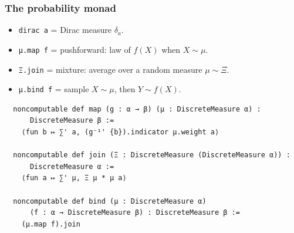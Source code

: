 \documentclass[11pt,aspectratio=169]{beamer}
\newcommand{\leanline}[1]{\texttt{#1}}%
\begin{document}

\begin{frame}[fragile]
  \frametitle{The probability monad}

  \begin{itemize}
  \item \leanline{dirac a} = Dirac measure $\delta_a$.
  \item \leanline{μ.map f} = pushforward: law of $f(X)$ when $X \sim μ$.
  \item \leanline{Ξ.join} = mixture: average over a random measure $\mu \sim \Xi$.
  \item \leanline{μ.bind f} = sample $X \sim μ$, then $Y \sim f(X)$.
  \end{itemize}

  \begin{verbatim}
  noncomputable def map (g : α → β) (μ : DiscreteMeasure α) :
      DiscreteMeasure β :=
    ⟨fun b ↦ ∑' a, (g⁻¹' {b}).indicator μ.weight a⟩

  noncomputable def join (Ξ : DiscreteMeasure (DiscreteMeasure α)) :
      DiscreteMeasure α :=
    ⟨fun a ↦ ∑' μ, Ξ μ * μ a⟩

  noncomputable def bind (μ : DiscreteMeasure α)
      (f : α → DiscreteMeasure β) : DiscreteMeasure β :=
    (μ.map f).join
  \end{verbatim}
\end{frame}
\end{document}
